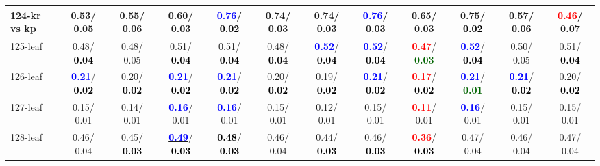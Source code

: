 \begin{table}[h]
\begin{center}
{\begin{tabular}{lc|c|c|c|c|c|c|c|c|c|c}
124-kr vs kp &   0.53/  0.05 &   0.55/  0.06 &   0.60/  0.03 & \textcolor{blue}{\textbf{  0.76}}/\textcolor{black}{\textbf{  0.02}} &   0.74/  0.03 &   0.74/  0.03 & \textcolor{blue}{\textbf{  0.76}}/  0.03 &   0.65/  0.03 &   0.75/\textcolor{black}{\textbf{  0.02}} &   0.57/  0.06 & \textcolor{red}{\textbf{  0.46}}/  0.07 \\ \hline
125-leaf &   0.48/\textcolor{black}{\textbf{  0.04}} &   0.48/  0.05 &   0.51/\textcolor{black}{\textbf{  0.04}} &   0.51/\textcolor{black}{\textbf{  0.04}} &   0.48/\textcolor{black}{\textbf{  0.04}} & \textcolor{blue}{\textbf{  0.52}}/\textcolor{black}{\textbf{  0.04}} & \textcolor{blue}{\textbf{  0.52}}/\textcolor{black}{\textbf{  0.04}} & \textcolor{red}{\textbf{  0.47}}/\textcolor{darkgreen}{\textbf{  0.03}} & \textcolor{blue}{\textbf{  0.52}}/\textcolor{black}{\textbf{  0.04}} &   0.50/  0.05 &   0.51/\textcolor{black}{\textbf{  0.04}} \\
126-leaf & \textcolor{blue}{\textbf{  0.21}}/\textcolor{black}{\textbf{  0.02}} &   0.20/\textcolor{black}{\textbf{  0.02}} & \textcolor{blue}{\textbf{  0.21}}/\textcolor{black}{\textbf{  0.02}} & \textcolor{blue}{\textbf{  0.21}}/\textcolor{black}{\textbf{  0.02}} &   0.20/\textcolor{black}{\textbf{  0.02}} &   0.19/\textcolor{black}{\textbf{  0.02}} & \textcolor{blue}{\textbf{  0.21}}/\textcolor{black}{\textbf{  0.02}} & \textcolor{red}{\textbf{  0.17}}/\textcolor{black}{\textbf{  0.02}} & \textcolor{blue}{\textbf{  0.21}}/\textcolor{darkgreen}{\textbf{  0.01}} & \textcolor{blue}{\textbf{  0.21}}/\textcolor{black}{\textbf{  0.02}} &   0.20/\textcolor{black}{\textbf{  0.02}} \\
127-leaf &   0.15/  0.01 &   0.14/  0.01 & \textcolor{blue}{\textbf{  0.16}}/  0.01 & \textcolor{blue}{\textbf{  0.16}}/  0.01 &   0.15/  0.01 &   0.12/  0.01 &   0.15/  0.01 & \textcolor{red}{\textbf{  0.11}}/  0.01 & \textcolor{blue}{\textbf{  0.16}}/  0.01 &   0.15/  0.01 &   0.15/  0.01 \\
128-leaf &   0.46/  0.04 &   0.45/\textcolor{black}{\textbf{  0.03}} & \underline{\textcolor{blue}{\textbf{  0.49}}}/\textcolor{black}{\textbf{  0.03}} & \textcolor{black}{\textbf{  0.48}}/\textcolor{black}{\textbf{  0.03}} &   0.46/  0.04 &   0.44/\textcolor{black}{\textbf{  0.03}} &   0.46/\textcolor{black}{\textbf{  0.03}} & \textcolor{red}{\textbf{  0.36}}/\textcolor{black}{\textbf{  0.03}} &   0.47/  0.04 &   0.46/  0.04 &   0.47/  0.04 \\\end{tabular}}\label{stratsALCKappa3Allalla}
\end{center}
\end{table}

